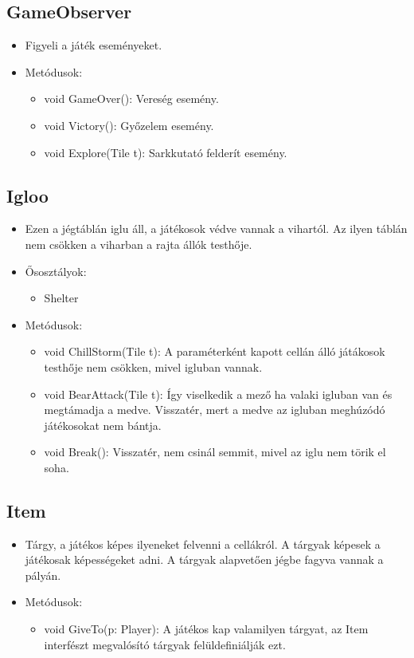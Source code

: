 \subsection{GameObserver}
\begin{itemize}
	\item Figyeli a játék eseményeket.
	\item Metódusok:
	\begin{itemize}
		\item void GameOver(): Vereség esemény.
		\item void Victory(): Győzelem esemény.
		\item void Explore(Tile t): Sarkkutató felderít esemény.
	\end{itemize}
\end{itemize}

\subsection{Igloo}
\begin{itemize}
	\item Ezen a jégtáblán iglu áll, a játékosok védve vannak a vihartól. Az ilyen táblán nem csökken a viharban a rajta állók testhője.
	\item Ősosztályok:
	\begin{itemize} 
		\item Shelter
	\end{itemize}
	\item Metódusok:
	\begin{itemize}
		\item void ChillStorm(Tile t): A paraméterként kapott cellán álló játákosok testhője nem csökken, mivel igluban vannak.
		\item void BearAttack(Tile t): Így viselkedik a mező ha valaki igluban van és megtámadja a medve. Visszatér, mert a medve az igluban meghúzódó játékosokat nem bántja.
		\item void Break(): Visszatér, nem csinál semmit, mivel az iglu nem törik el soha.
	\end{itemize}
\end{itemize}

\subsection{Item}
\begin{itemize}
	\item Tárgy, a játékos képes ilyeneket felvenni a cellákról. A tárgyak képesek a játékosak képességeket adni. A tárgyak alapvetően jégbe fagyva vannak a pályán.
	\item Metódusok:
	\begin{itemize}
		\item void GiveTo(p: Player): A játékos kap valamilyen tárgyat, az Item interfészt megvalósító tárgyak felüldefiniálják ezt.
	\end{itemize}
\end{itemize}

